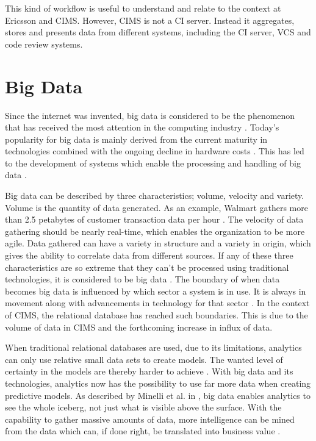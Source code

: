 This kind of workflow is useful to understand and relate to the context at Ericsson and CIMS. However, CIMS is not a CI server. Instead it aggregates, stores and presents data from different systems, including the CI server, VCS and code review systems.

\section{Big Data}
Since the internet was invented, big data is considered to be the phenomenon that has received the most attention in the computing industry \cite{bigDataWarehouse}. Today's popularity for big data is mainly derived from the current maturity in technologies combined with the ongoing decline in hardware costs \cite{bigDataWarehouse, bigDatabigAn}. This has led to the development of systems which enable the processing and handling of big data \cite{bigDataWarehouse}.

Big data can be described by three characteristics; volume, velocity and variety. Volume is the quantity of data generated. As an example, Walmart gathers more than 2.5 petabytes of customer transaction data per hour \cite{bigDataMane}. The velocity of data gathering should be nearly real-time, which enables the organization to be more agile. Data gathered can have a variety in structure and a variety in origin, which gives the ability to correlate data from different sources. If any of these three characteristics are so extreme that they can't be processed using traditional technologies, it is considered to be big data \cite{bigDataWarehouse}. The boundary of when data becomes big data is influenced by which sector a system is in use. It is always in movement along with advancements in technology for that sector \cite{bigDatabigAn}. In the context of CIMS, the relational database has reached such boundaries. This is due to the volume of data in CIMS and the forthcoming increase in influx of data.  

When traditional relational databases are used, due to its limitations, analytics can only use relative small data sets to create models. The wanted level of certainty in the models are thereby harder to achieve \cite{bigDatabigAn}. With big data and its technologies, analytics now has the possibility to use far more data when creating predictive models. As described by Minelli et al. in \cite{bigDatabigAn}, big data enables analytics to see the whole iceberg, not just what is visible above the surface. With the capability to gather massive amounts of data, more intelligence can be mined from the data which can, if done right, be translated into business value \cite{bigDataMane}.

